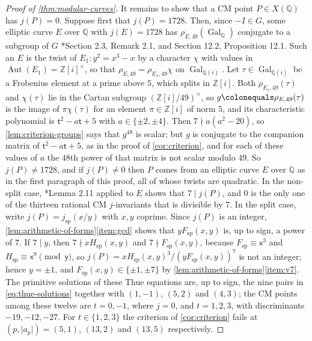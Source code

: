 \documentclass[12pt]{amsart}
\newcommand{\Q}{\mathbb{Q}}
\newcommand{\Z}{\mathbb{Z}}
\newcommand{\x}{\mathsf{x}}
\newcommand{\y}{\mathsf{y}}
\renewcommand{\t}{\mathsf{t}}
\DeclareMathOperator{\spc}{sp}
\DeclareMathOperator{\Aut}{Aut}
\DeclareMathOperator{\Gal}{Gal}
\numberwithin{equation}{section}
\theoremstyle{definition}
\begin{document}
\begin{proof}[Proof of \cref{thm:modular-curves}]
  It remains to show that a CM point $P \in X(\Q)$ has $j(P) = 0$. Suppose first
  that $j(P) = 1728$. Then, since $-I \in G$, some elliptic curve $E$ over $\Q$
  with $j(E) = 1728$ has $\rho_{E,49}(\Gal_\Q)$ conjugate to a subgroup of $G$
  \cite{RSZB-22}*{Section 2.3, Remark 2.1, and Section 12.2, Proposition 12.1}. Such an $E$
  is the twist of $E_1\colon y^2 = x^3 - x$ by a character $\chi$ with values
  in $\Aut(E_1) = \Z[i]^{\times}$, so that $\rho_{E,49} = \rho_{E_1,49}\chi$
  on $\Gal_{\Q(i)}$. Let $\tau \in \Gal_{\Q(i)}$ be a Frobenius element at a
  prime above $5$, which splits in $\Z[i]$. Both $\rho_{E_1,49}(\tau)$ and
  $\chi(\tau)$ lie in the Cartan subgroup $(\Z[i]/49)^{\times}$, so
  $g \colonequals \rho_{E,49}(\tau)$ is the image of $\pi\chi(\tau)$ for an
  element $\pi \in \Z[i]$ of norm $5$, and its characteristic polynomial is
  $\t^2 - a\t + 5$ with $a \in \{\pm 2, \pm 4\}$. Then $7 \nmid a(a^2 - 20)$,
  so \cref{lem:criterion-groups} says that $g^{48}$ is scalar; but $g$ is
  conjugate to the companion matrix of $\t^2 - a\t + 5$, as in the proof of
  \cref{cor:criterion}, and for each of these values of $a$ the $48$th power
  of that matrix is not scalar modulo $49$. So $j(P) \neq 1728$, and if
  $j(P) \neq 0$ then $P$ comes from an elliptic curve $E$ over $\Q$ as in the
  first paragraph of this proof,
  all of whose twists are quadratic. In the non-split case,
  \cite{Furio--Lombardo26}*{Lemma 2.11} applied to $E$ shows that $7 \mid j(P)$, and $0$
  is the only one of the thirteen rational CM $j$-invariants that is divisible
  by $7$. In the split case, write $j(P) = j_{\spc}(x/y)$ with $x,y$ coprime.
  Since $j(P)$ is an integer, \cref{lem:arithmetic-of-forms}\eqref{item:gcd}
  shows that $yF_{\spc}(x,y)$ is, up to sign, a power of $7$. If $7 \mid y$,
  then $7 \nmid xH_{\spc}(x,y)$ and $7 \nmid F_{\spc}(x,y)$, because
  $F_{\spc} \equiv \x^{3}$ and $H_{\spc} \equiv \x^{9} \pmod{\y}$, so
  $j(P) = xH_{\spc}(x,y)^{3}/(yF_{\spc}(x,y))^{7}$ is not an integer; hence
  $y = \pm 1$, and $F_{\spc}(x,y) \in \{\pm 1, \pm 7\}$ by
  \cref{lem:arithmetic-of-forms}\eqref{item:v7}. The primitive solutions of
  these Thue equations are, up to sign, the nine pairs in \cref{eq:thue-solutions} together with
  $(1,-1)$, $(5,2)$ and $(4,3)$; the CM points among these twelve are $t = 0, -1$,
  where $j = 0$, and $t = 1, 2, 3$, with discriminants $-19, -12, -27$. For $t
  \in \{1,2,3\}$ the criterion of \cref{cor:criterion} fails at
  $(p,\lvert a_p\rvert) = (5,1)$, $(13,2)$ and $(13,5)$ respectively.
\end{proof}
\end{document}
